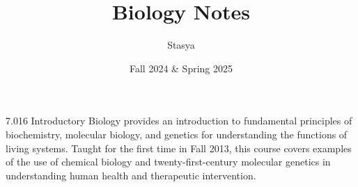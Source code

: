 \documentclass[10pt,a4paper,oneside]{book}
\title{Biology Notes}
\author{Stasya}
\date{Fall 2024 \& Spring 2025}
\begin{document}
\maketitle
\bigbreak
\begin{center}
    7.016 Introductory Biology provides an introduction to fundamental principles of biochemistry, molecular biology, and 
    genetics for understanding the functions of living systems. Taught for the first time in Fall 2013, this course covers 
    examples of the use of chemical biology and twenty-first-century molecular genetics in understanding human health and 
    therapeutic intervention.
\end{center}
\bigbreak
\tableofcontents




\end{document}
